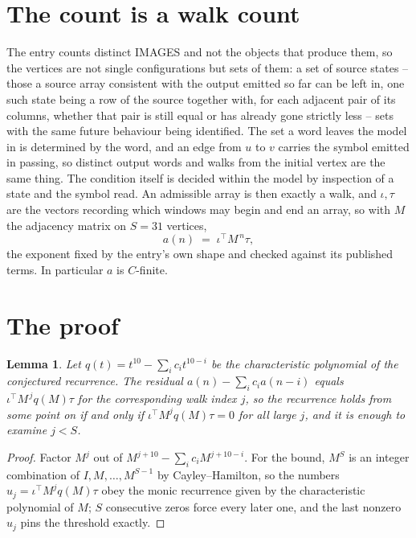 \documentclass[11pt,a4paper]{article}
\theoremstyle{plain}
\newtheorem{lemma}[theorem]{Lemma}
\theoremstyle{definition}
\begin{document}
\section{The count is a walk count}

The entry counts distinct IMAGES and not the objects that produce them, so the vertices are not single configurations but sets of them: a set of source states -- those a source array consistent with the output emitted so far can be left in, one such state being a row of the source together with, for each adjacent pair of its columns, whether that pair is still equal or has already gone strictly less -- sets with the same future behaviour being identified. The set a word leaves the model in is determined by the word, and an edge from $u$ to $v$ carries the symbol emitted in passing, so distinct output words and walks from the initial vertex are the same thing. The condition itself is decided within the model by inspection of a state and the symbol read.
An admissible array is then exactly a walk, and $\iota,\tau$ are the vectors recording which windows may begin and end an array, so with $M$ the adjacency matrix on $S=31$ vertices,
\[
a(n)\;=\;\iota^{\!\top}M^{\,n}\tau ,
\]
the exponent fixed by the entry's own shape and checked against its published terms. In
particular $a$ is $C$-finite.

\section{The proof}

\begin{lemma}\label{lem:crit}
Let $q(t)=t^{10}-\sum_i c_it^{10-i}$ be the characteristic polynomial of the
conjectured recurrence. The residual $a(n)-\sum_ic_ia(n-i)$ equals
$\iota^{\!\top}M^{\,j}q(M)\tau$ for the corresponding walk index $j$, so the recurrence
holds from some point on if and only if $\iota^{\!\top}M^{j}q(M)\tau=0$ for all large $j$,
and it is enough to examine $j<S$.
\end{lemma}

\begin{proof}
Factor $M^{j}$ out of $M^{j+10}-\sum_ic_iM^{j+10-i}$. For the bound, $M^{S}$
is an integer combination of $I,M,\dots,M^{S-1}$ by Cayley--Hamilton, so the numbers
$u_j=\iota^{\!\top}M^{j}q(M)\tau$ obey the monic recurrence given by the characteristic
polynomial of $M$; $S$ consecutive zeros force every later one, and the last nonzero $u_j$
pins the threshold exactly.
\end{proof}
\end{document}
